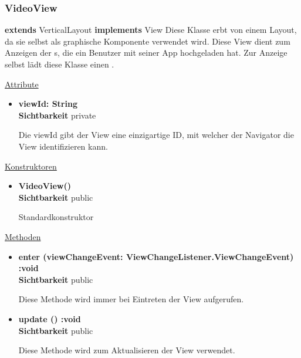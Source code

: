 \newpage
\subsubsection{VideoView}\label{VideoView}
\textbf{extends}  VerticalLayout \newline
\textbf{implements} View \newline
Diese Klasse erbt von einem Layout, da sie selbst als graphische Komponente verwendet wird. Diese View dient zum Anzeigen der s, die ein Benutzer mit seiner App hochgeladen hat. Zur Anzeige selbst lädt diese Klasse einen .
\newline

\underline{Attribute}
\begin{itemize}
\itemsep0pt
\item \textbf{viewId: String} \hfill\\ 
\textbf{Sichtbarkeit} private

Die viewId gibt der View eine einzigartige ID, mit welcher der Navigator die View identifizieren kann.

\end{itemize}

\underline{Konstruktoren}
\begin{itemize}
\itemsep0pt
\item \textbf{VideoView()} \hfill\\
\textbf{Sichtbarkeit} public

Standardkonstruktor
\end{itemize}

\underline{Methoden}
\begin{itemize}
\itemsep0pt
\item \textbf{enter (viewChangeEvent: ViewChangeListener.ViewChangeEvent) :void}\hfill\\
\textbf{Sichtbarkeit} public

Diese Methode wird immer bei Eintreten der View aufgerufen.

\item \textbf{update () :void}\hfill\\
\textbf{Sichtbarkeit} public

Diese Methode wird zum Aktualisieren der View verwendet.

\end{itemize}
